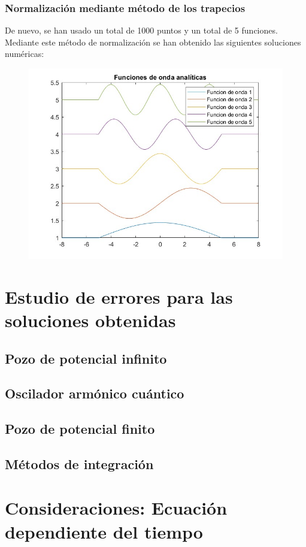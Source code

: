 \documentclass[12pt]{article}
\begin{document}
\subsubsection{Normalización mediante método de los trapecios}
De nuevo, se han usado un total de 1000 puntos y un total de 5 
funciones. Mediante este método de normalización se han obtenido
las siguientes soluciones numéricas:
\newpage
\begin{figure}[h]
\centering
\includegraphics[scale=0.5]{trap.jpg}
\end{figure} 
\section{Estudio de errores para las soluciones obtenidas}

    \subsection{Pozo de potencial infinito}
    
    \subsection{Oscilador armónico cuántico}

    \subsection{Pozo de potencial finito}

    \subsection{Métodos de integración}
    
\section{Consideraciones: Ecuación dependiente del tiempo}
\end{document}

